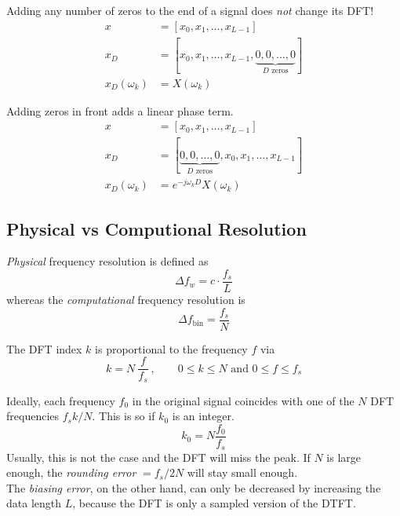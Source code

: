 Adding any number of zeros to the end of a signal does \emph{not} change its DFT!
\begin{align*}
	x &= [x_0,x_1,\ldots,x_{L-1}] \\
	x_D &= [x_0,x_1,\ldots,x_{L-1},\underbrace{0,0,\ldots,0}_{D \text{ zeros}}] \\
	x_D(\omega_k) &= X(\omega_k)
\end{align*}

Adding zeros in front adds a linear phase term.
\begin{align*}
	x &= [x_0,x_1,\ldots,x_{L-1}] \\
	x_D &= [\underbrace{0,0,\ldots,0}_{D \text{ zeros}},x_0,x_1,\ldots,x_{L-1}] \\
	x_D(\omega_k) &= e^{-j \omega_k D} X(\omega_k)
\end{align*}

\subsection{Physical vs Computional Resolution}

\emph{Physical} frequency resolution is defined as
\begin{equation*}
	\Delta f_w = c \cdot \frac{f_s}{L}
\end{equation*}
whereas the \emph{computational} frequency resolution is
\begin{equation*}
	\Delta f_{\text{bin}} = \frac{f_s}{N}
\end{equation*}

The DFT index $k$ is proportional to the frequency $f$ via
\begin{equation*}
	k = N\:\frac{f}{f_s}\:, \qquad 0\leq k \leq N \text{ and } 0 \leq f \leq f_s
\end{equation*}

Ideally, each frequency $f_0$ in the original signal coincides with one
of the $N$ DFT frequencies $f_s k / N$. This is so if $k_0$ is an integer.
\begin{equation*}
	k_0 = N \frac{f_0}{f_s}
\end{equation*}
Usually, this is not the case and the DFT will miss the peak. If $N$ is large
enough, the \emph{rounding error} $= f_s / 2N$ will stay small enough. \\

The \emph{biasing error}, on the other hand, can only be decreased by
increasing the data length $L$, because the DFT is only a sampled version
of the DTFT.


